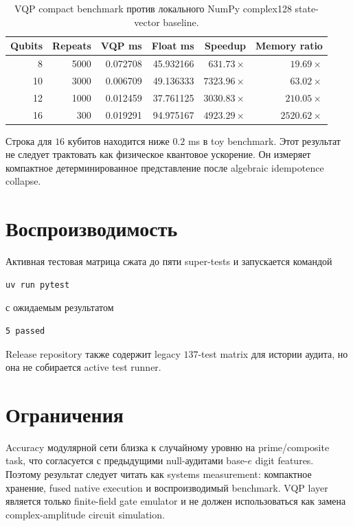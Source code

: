 \documentclass[11pt]{article}
\begin{document}
\begin{table}[h]
\centering
\caption{VQP compact benchmark против локального NumPy complex128 state-vector
baseline.}
\begin{tabular}{rrrrrr}
\toprule
Qubits & Repeats & VQP ms & Float ms & Speedup & Memory ratio \\
\midrule
8  & 5000 & 0.072708 & 45.932166 & $631.73\times$ & $19.69\times$ \\
10 & 3000 & 0.006709 & 49.136333 & $7323.96\times$ & $63.02\times$ \\
12 & 1000 & 0.012459 & 37.761125 & $3030.83\times$ & $210.05\times$ \\
16 & 300  & 0.019291 & 94.975167 & $4923.29\times$ & $2520.62\times$ \\
\bottomrule
\end{tabular}
\end{table}

Строка для $16$ кубитов находится ниже $0.2$ ms в toy benchmark. Этот результат
не следует трактовать как физическое квантовое ускорение. Он измеряет
компактное детерминированное представление после algebraic idempotence collapse.

\section{Воспроизводимость}

Активная тестовая матрица сжата до пяти super-tests и запускается командой
\begin{verbatim}
uv run pytest
\end{verbatim}
с ожидаемым результатом
\begin{verbatim}
5 passed
\end{verbatim}
Release repository также содержит legacy $137$-test matrix для истории аудита,
но она не собирается active test runner.

\section{Ограничения}

Accuracy модулярной сети близка к случайному уровню на prime/composite task,
что согласуется с предыдущими null-аудитами base-$e$ digit features. Поэтому
результат следует читать как systems measurement: компактное хранение, fused
native execution и воспроизводимый benchmark. VQP layer является только
finite-field gate emulator и не должен использоваться как замена
complex-amplitude circuit simulation.
\end{document}
